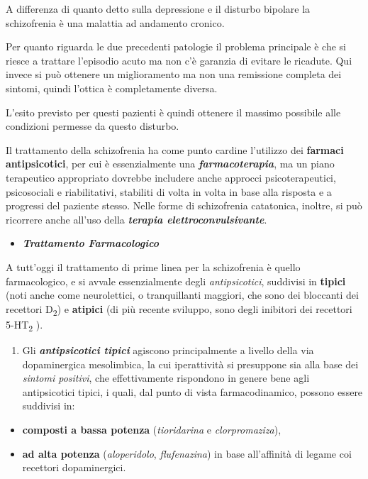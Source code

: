 \documentclass[]{article}
\begin{document}
A differenza di quanto detto sulla depressione e il disturbo bipolare la
schizofrenia è una malattia ad andamento cronico.

Per quanto riguarda le due precedenti patologie il problema principale è
che si riesce a trattare l'episodio acuto ma non c'è garanzia di evitare
le ricadute. Qui invece si può ottenere un miglioramento ma non una
remissione completa dei sintomi, quindi l'ottica è completamente
diversa.

L'esito previsto per questi pazienti è quindi ottenere il massimo
possibile alle condizioni permesse da questo disturbo.

Il trattamento della schizofrenia ha come punto cardine l'utilizzo dei
\textbf{farmaci antipsicotici}, per cui è essenzialmente una
\textbf{\emph{farmacoterapia}}, ma un piano terapeutico appropriato
dovrebbe includere anche approcci psicoterapeutici, psicosociali e
riabilitativi, stabiliti di volta in volta in base alla risposta e a
progressi del paziente stesso. Nelle forme di schizofrenia catatonica,
inoltre, si può ricorrere anche all'uso della \textbf{\emph{terapia
elettroconvulsivante}}.

\begin{itemize}
\item
  \textbf{\emph{Trattamento Farmacologico}}
\end{itemize}

A tutt'oggi il trattamento di prime linea per la schizofrenia è quello
farmacologico, e si avvale essenzialmente degli \emph{antipsicotici},
suddivisi in \textbf{tipici} (noti anche come neurolettici, o
tranquillanti maggiori, che sono dei bloccanti dei recettori
D\textsubscript{2}) e \textbf{atipici} (di più recente sviluppo, sono
degli inibitori dei recettori 5-HT\textsubscript{2} ).

\begin{enumerate}
\def\labelenumi{\arabic{enumi}.}
\item
  Gli \textbf{\emph{antipsicotici tipici}} agiscono principalmente a
  livello della via dopaminergica mesolimbica, la cui iperattività si
  presuppone sia alla base dei \emph{sintomi positivi}, che
  effettivamente rispondono in genere bene agli antipsicotici tipici, i
  quali, dal punto di vista farmacodinamico, possono essere suddivisi
  in:
\end{enumerate}

\begin{itemize}
\item
  \textbf{composti a bassa potenza} (\emph{tioridarina} e
  \emph{clorpromaziza}),
\item
  \textbf{ad alta potenza} (\emph{aloperidolo}, \emph{flufenazina}) in
  base all'affinità di legame coi recettori dopaminergici.
\end{itemize}
\end{document}
